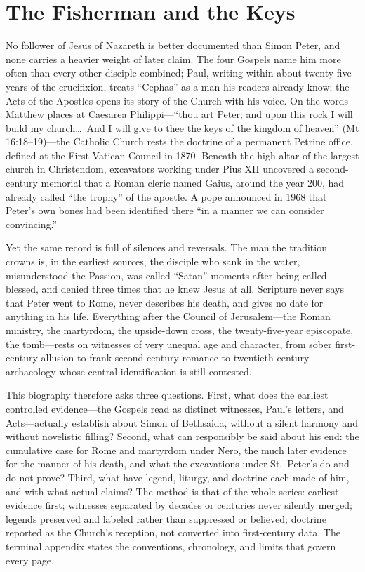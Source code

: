 \section{The Fisherman and the Keys}

No follower of Jesus of Nazareth is better documented than Simon Peter, and
none carries a heavier weight of later claim. The four Gospels name him more
often than every other disciple combined; Paul, writing within about
twenty-five years of the crucifixion, treats ``Cephas'' as a man his readers
already know; the Acts of the Apostles opens its story of the Church with his
voice. On the words Matthew places at Caesarea Philippi---``thou art Peter;
and upon this rock I will build my church\ldots\ And I will give to thee the
keys of the kingdom of heaven'' (Mt 16:18--19)---the Catholic Church rests
the doctrine of a permanent Petrine office, defined at the First Vatican
Council in 1870. Beneath the high altar of the largest church in Christendom,
excavators working under Pius XII uncovered a second-century memorial that a
Roman cleric named Gaius, around the year 200, had already called ``the
trophy'' of the apostle. A pope announced in 1968 that Peter's own bones had
been identified there ``in a manner we can consider convincing.''

Yet the same record is full of silences and reversals. The man the tradition
crowns is, in the earliest sources, the disciple who sank in the water,
misunderstood the Passion, was called ``Satan'' moments after being called
blessed, and denied three times that he knew Jesus at all. Scripture never
says that Peter went to Rome, never describes his death, and gives no date
for anything in his life. Everything after the Council of Jerusalem---the
Roman ministry, the martyrdom, the upside-down cross, the twenty-five-year
episcopate, the tomb---rests on witnesses of very unequal age and character,
from sober first-century allusion to frank second-century romance to
twentieth-century archaeology whose central identification is still
contested.

This biography therefore asks three questions. First, what does the earliest
controlled evidence---the Gospels read as distinct witnesses, Paul's letters,
and Acts---actually establish about Simon of Bethsaida, without a silent
harmony and without novelistic filling? Second, what can responsibly be said
about his end: the cumulative case for Rome and martyrdom under Nero, the
much later evidence for the manner of his death, and what the excavations
under St.~Peter's do and do not prove? Third, what have legend, liturgy, and
doctrine each made of him, and with what actual claims? The method is that of
the whole series: earliest evidence first; witnesses separated by decades or
centuries never silently merged; legends preserved and labeled rather than
suppressed or believed; doctrine reported as the Church's reception, not
converted into first-century data. The terminal appendix states the
conventions, chronology, and limits that govern every page.

